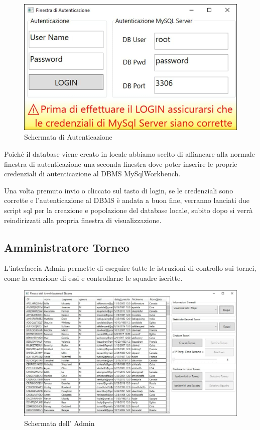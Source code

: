 \documentclass[a4paper,12pt]{report}
\begin{document}
\begin{figure}[!htb]
	\centerline{\includegraphics[width=\textwidth]{img/autenticazione.jpg}}
	\caption{Schermata di Autenticazione}
\end{figure}

Poiché il database viene creato in locale abbiamo scelto di affiancare alla normale finestra di autenticazione una seconda finestra dove poter inserire le proprie credenziali di autenticazione al DBMS MySqlWorkbench. 

Una volta premuto invio o cliccato sul tasto di login, se le credenziali sono corrette e l'autenticazione al DBMS è andata a buon fine, verranno lanciati due script sql per la creazione e popolazione del database locale, subito dopo si verrà reindirizzati alla propria finestra di visualizzazione.
\subsection{Amministratore Torneo}
L’interfaccia Admin permette di eseguire tutte le istruzioni di controllo sui tornei, come la creazione di essi e controllarne le squadre iscritte.

\begin{figure}[!htb]
	\centerline{\includegraphics[scale=0.6]{img/admin_filled.jpg}}
	\caption{Schermata dell' Admin}
\end{figure}
\end{document}
